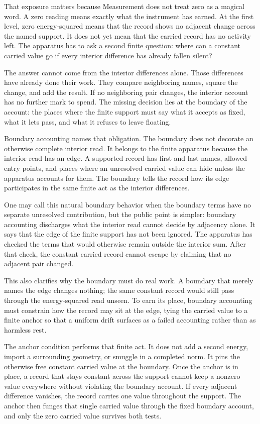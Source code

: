 That exposure matters because Measurement does not treat zero as a magical
word. A zero reading means exactly what the instrument has earned. At the
first level, zero energy-squared means that the record shows no adjacent
change across the named support. It does not yet mean that the carried record
has no activity left. The apparatus has to ask a second finite question:
where can a constant carried value go if every interior difference has already
fallen silent?

The answer cannot come from the interior differences alone. Those differences
have already done their work. They compare neighboring names, square the
change, and add the result. If no neighboring pair changes, the interior
account has no further mark to spend. The missing decision lies at the
boundary of the account: the places where the finite support must say what it
accepts as fixed, what it lets pass, and what it refuses to leave floating.

Boundary accounting names that obligation. The boundary does not decorate an
otherwise complete interior read. It belongs to the finite apparatus because
the interior read has an edge. A supported record has first and last names,
allowed entry points, and places where an unresolved carried value can hide
unless the apparatus accounts for them. The boundary tells the record how its
edge participates in the same finite act as the interior differences.

One may call this natural boundary behavior when the boundary terms have no
separate unresolved contribution, but the public point is simpler: boundary
accounting discharges what the interior read cannot decide by adjacency alone.
It says that the edge of the finite support has not been ignored. The
apparatus has checked the terms that would otherwise remain outside the
interior sum. After that check, the constant carried record cannot escape by
claiming that no adjacent pair changed.

This also clarifies why the boundary must do real work. A boundary that merely
names the edge changes nothing; the same constant record would still pass
through the energy-squared read unseen. To earn its place, boundary accounting
must constrain how the record may sit at the edge, tying the carried value to a
finite anchor so that a uniform drift surfaces as a failed accounting rather
than as harmless rest.

The anchor condition performs that finite act. It does not add a second
energy, import a surrounding geometry, or smuggle in a completed norm. It pins
the otherwise free constant carried value at the boundary. Once the anchor is
in place, a record that stays constant across the support cannot keep a
nonzero value everywhere without violating the boundary account. If every
adjacent difference vanishes, the record carries one value throughout the
support. The anchor then funges that single carried value through the fixed
boundary account, and only the zero carried value survives both tests.

